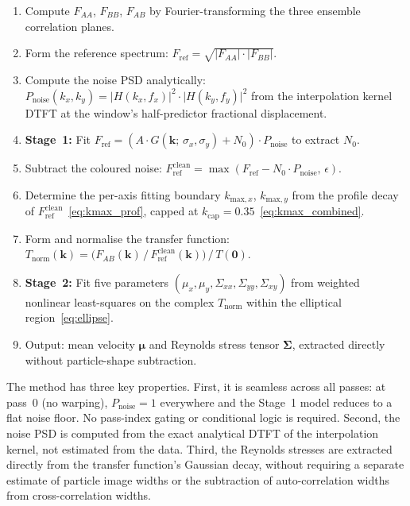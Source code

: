 \documentclass[11pt,a4paper]{article}
\newcommand{\kv}{\mathbf{k}}
\newcommand{\muv}{\bm{\mu}}
\newcommand{\Sigv}{\bm{\Sigma}}
\newcommand{\Fref}{F_\mathrm{ref}}
\newcommand{\Fclean}{F_\mathrm{ref}^\mathrm{clean}}
\newcommand{\Pnoise}{P_\mathrm{noise}}
\begin{document}
\begin{enumerate}[leftmargin=2em, itemsep=2pt]
    \item Compute $F_{AA}$, $F_{BB}$, $F_{AB}$ by Fourier-transforming the three ensemble correlation planes.

    \item Form the reference spectrum: $\Fref = \sqrt{\lvert F_{AA}\rvert \cdot \lvert F_{BB}\rvert}$.

    \item Compute the noise PSD analytically: $\Pnoise(k_x, k_y) = \lvert H(k_x, f_x)\rvert^2 \cdot \lvert H(k_y, f_y)\rvert^2$ from the interpolation kernel DTFT at the window's half-predictor fractional displacement.

    \item \textbf{Stage~1:} Fit $\Fref = (A \cdot G(\kv;\, \sigma_x, \sigma_y) + N_0) \cdot \Pnoise$ to extract $N_0$.

    \item Subtract the coloured noise: $\Fclean = \max(\Fref - N_0 \cdot \Pnoise,\, \epsilon)$.

    \item Determine the per-axis fitting boundary $k_{\mathrm{max},x}$, $k_{\mathrm{max},y}$ from the profile decay of $\Fclean$~\eqref{eq:kmax_prof}, capped at $k_\mathrm{cap} = 0.35$~\eqref{eq:kmax_combined}.

    \item Form and normalise the transfer function: $T_\mathrm{norm}(\kv) = \bigl(F_{AB}(\kv)\, /\, \Fclean(\kv)\bigr)\, /\, T(\mathbf{0})$.

    \item \textbf{Stage~2:} Fit five parameters $(\mu_x, \mu_y, \Sigma_{xx}, \Sigma_{yy}, \Sigma_{xy})$ from weighted nonlinear least-squares on the complex $T_\mathrm{norm}$ within the elliptical region~\eqref{eq:ellipse}.

    \item Output: mean velocity $\muv$ and Reynolds stress tensor $\Sigv$, extracted directly without particle-shape subtraction.
\end{enumerate}

The method has three key properties.
First, it is seamless across all passes: at pass~0 (no warping), $\Pnoise = 1$ everywhere and the Stage~1 model reduces to a flat noise floor.
No pass-index gating or conditional logic is required.
Second, the noise PSD is computed from the exact analytical DTFT of the interpolation kernel, not estimated from the data.
Third, the Reynolds stresses are extracted directly from the transfer function's Gaussian decay, without requiring a separate estimate of particle image widths or the subtraction of auto-correlation widths from cross-correlation widths.
\end{document}
